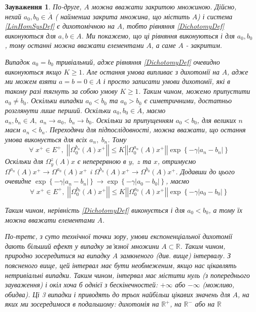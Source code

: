 \documentclass[14pt]{extarticle} %
\let\oldforall\forall
\renewcommand{\forall}{\oldforall\;}
\newcommand{\mynorm}[1]{\left|\left|#1\right|\right|}
\newcommand{\myabs}[1]{\left|#1\right|}
\newtheorem{remark}{Зауваження}
\begin{document}
\begin{remark}
	По-друге, $A$ можна вважати закритою множиною. Дійсно, нехай $a_0,b_0\in\overline{A}$ (
	найменша закрита множина, що містить $A$) і система \ref{LinHomSysDef} є дихотомічною на $A$,
	тобто рівняння \ref{DichotomyDef} виконуються для $a,b\in A$. Ми покажемо, що ці рівняння виконуються і для $a_0,b_0$, тому останні можна
	вважати елементами $A$, а саме $A$ - закритим.

	Випадок $a_0=b_0$ тривіальний, адже рівняння \ref{DichotomyDef} очевидно виконуються якщо $K\geq 1$. Але остання умова випливає з дихотомії
	на $A$, адже ми можем взяти $a=b=0\in A$ і просто записати умови дихотомії, які в такому разі тягнуть за собою умову $K\geq 1$. Таким чином,
	можемо припустити $a_0\neq b_0$. Оскільки випадки $a_0<b_0$ та $a_0>b_0$ є симетричними, достатньо розглянути лише перший. Оскільки $a_0,
	b_0\in\overline{A}$, маємо $a_n,b_n\in A,\; a_n\to a_0,\;b_n\to b_0$. Оскільки за припущенням $a_0<b_0$, для великих $n$ маєм
	$a_n<b_n$. Переходячи для підпослідовності, можна вважати, що остання умова виконується для всіх $a_n,\;b_n$. Тому
	\[\forall x^+\in E^+,\;\mynorm{\Omega^{b_n}_0(A)x^+}\leq K\mynorm{\Omega_0^{a_n}(A)x^+}\exp\left\{-\gamma\myabs{a_n-b_n}\right\}\]
	Оскільки для $\Omega_y^z(A)x$ є неперервною в $y,\;z$ та $x$, отримуємо $\Omega^{a_n}(A)x^+\to\Omega^{a_0}(A)x^+$ i
	$\Omega^{b_n}(A)x^+\to\Omega^{b_0}(A)x^+$. Додавши до цього очевидне $\exp\left\{-\gamma\myabs{a_n-b_n}\right\}\to
	\exp\left\{-\gamma\myabs{a_0-b_0}\right\}$, маємо
	\[\forall x^+\in E^+,\;\mynorm{\Omega^{b_0}_0(A)x^+}\leq K\mynorm{\Omega_0^{a_0}(A)x^+}\exp\left\{-\gamma\myabs{a_0-b_0}\right\}\]

	Таким чином, нерівність \ref{DichotomyDef} виконується і для $a_0< b_0$, а тому їх можна вважати елементами $A$.

	По-третє, з суто технічної точки зору, умови експоненціальної дихотомії дають більший ефект у випадку зв’язної множини $A\subset\mathbb{R}$.
	Таким чином, природно зосередитися на випадку $A$ замкненого (див. вище) інтервалу. З поясненого вище, цей інтервал має бути необмеженим,
	якщо нас цікавлять нетривіальні випадки. Таким чином, інтервал має містити нуль (з попереднього зауваження) і окіл хоча б однієї
	з бескінечностей: $+\infty$ або $-\infty$ (можливо, обидва). Ці 3 випадки і приводять до трьох найбільш цікавих значень для $A$, на
	яких ми зосередимося в подальшому: дихотомія на $\mathbb{R}^+$, на $\mathbb{R}^-$ або на $\mathbb{R}$
\end{remark}
\end{document}
